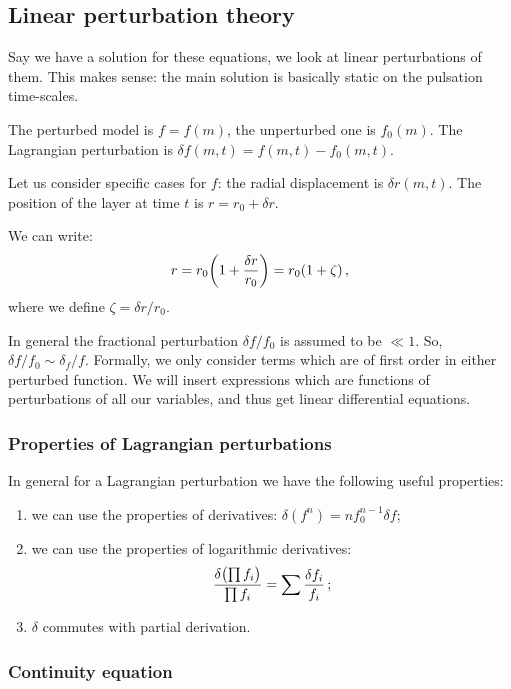 \documentclass[main.tex]{subfiles}
\begin{document}
\subsection{Linear perturbation theory}

Say we have a solution for these equations, we look at linear perturbations of them.
This makes sense: the main solution is basically static on the pulsation time-scales.

The perturbed model is \(f = f(m)\),  the unperturbed one is \(f_0(m)\).
The Lagrangian perturbation is \(\delta f (m, t) = f(m, t) - f_0(m, t)\).

Let us consider specific cases for \(f\): the radial displacement is \(\delta r (m, t)\). The position of the layer at time \(t\) is \(r = r_0 + \delta r\).

We can write:
%
\begin{equation}
  r = r_0 \qty(1 + \frac{\delta r}{r_0} ) = r_0 (1+ \zeta)
  \,,
\end{equation}
%
where we define \(\zeta = \delta r / r_0 \).

In general the fractional perturbation \(\delta f / f_0\) is assumed to be \(\ll 1 \). So, \(\delta f / f_0 \sim \delta_f / f\). Formally, we only consider terms which are of first order in either perturbed function.
We will insert expressions which are functions of perturbations of all our variables, and thus get linear differential equations.

\subsubsection{Properties of Lagrangian perturbations}

In general for a Lagrangian perturbation we have the following useful properties: 
\begin{enumerate}
  \item we can use the properties of derivatives: \(\delta (f^n) = n f_0^{n-1} \delta f\);
  \item we can use the properties of logarithmic derivatives:
  \begin{align} \label{eq:lagrangian-perturbation-logarithmic}
  \frac{ \delta \qty( \prod f_i)}{\prod f_i} = \sum \frac{ \delta f_i}{f_i}
  \,;
  \end{align}
  \item \(\delta \) commutes with partial derivation. 
\end{enumerate}

\subsubsection{Continuity equation}
\end{document}
